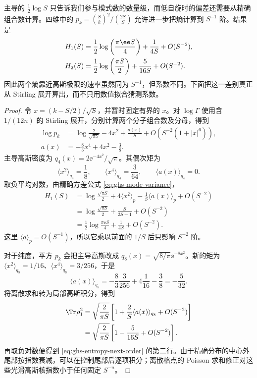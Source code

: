 \begin{proposition}[四维单体熵的有限自旋修正]
主导的 $\tfrac12\log S$ 只告诉我们参与模式数的数量级，而低自旋时的偏差还需要从精确组合数计算。四维中的 $p_k=\binom Sk^2/\binom{2S}{S}$ 允许进一步把熵计算到 $S^{-1}$ 阶。结果是
\begin{align}\label{eq:ghs-entropy-next-order}
 H_1(S)&=\frac12\log\left(\frac{\pi\ee S}{4}\right)
 +\frac1{4S}+O(S^{-2}),\\
 H_2(S)&=\frac12\log\left(\frac{\pi S}{2}\right)
 +\frac5{16S}+O(S^{-2}).\notag
\end{align}
因此两个熵靠近高斯极限的速率虽然同为 $S^{-1}$，但系数不同。下面把这一差别真正从 Stirling 展开算出，而不只用数值拟合猜测系数。
\end{proposition}

\begin{proof}
令 $x=(k-S/2)/\sqrt S$，并暂时固定有界的 $x$。对 $\log\Gamma$ 使用含 $1/(12n)$ 的 Stirling 展开，分别计算两个分子组合数及分母，得到
\begin{align*}
\log p_k
&=\log\frac2{\sqrt{\pi S}}-4x^2+\frac{a(x)}S
+O\left(S^{-2}(1+|x|^6)\right),\\
a(x)&=-\frac83x^4+4x^2-\frac38.
\end{align*}
主导高斯密度为 $q_4(x)=2\ee^{-4x^2}/\sqrt\pi$。其偶次矩为
\begin{equation*}
\langle x^2\rangle_{q_4}=\frac18,\qquad
\langle x^4\rangle_{q_4}=\frac3{64},\qquad
\langle a(x)\rangle_{q_4}=0.
\end{equation*}
取负平均对数，由精确方差公式 \cref{eq:ghs-mode-variance}，
\begin{align*}
H_1(S)
&=\log\frac{\sqrt{\pi S}}2+4\langle x^2\rangle_{p}
-\frac1S\langle a(x)\rangle_{p}+O(S^{-2})\\
&=\log\frac{\sqrt{\pi S}}2
+\frac{S}{2S-1}+O(S^{-2})\\
&=\frac12\log\frac{\pi\ee S}{4}
+\frac1{4S}+O(S^{-2}).
\end{align*}
这里 $\langle a\rangle_p=O(S^{-1})$，所以它乘以前面的 $1/S$ 后只影响 $S^{-2}$ 阶。

对于纯度，平方 $p_k$ 会把主导高斯改成 $q_8(x)=\sqrt{8/\pi}\ee^{-8x^2}$。新的矩为 $\langle x^2\rangle_{q_8}=1/16$、$\langle x^4\rangle_{q_8}=3/256$，于是
\begin{equation*}
\langle a(x)\rangle_{q_8}
=-\frac83\frac3{256}+4\frac1{16}-\frac38
=-\frac5{32}.
\end{equation*}
将离散求和转为局部高斯积分，得到
\begin{align*}
\Tr\rho_1^2
&=\sqrt{\frac2{\pi S}}
\left[1+\frac2S\langle a(x)\rangle_{q_8}
+O(S^{-2})\right]\\
&=\sqrt{\frac2{\pi S}}
\left[1-\frac5{16S}+O(S^{-2})\right].
\end{align*}
再取负对数便得到 \cref{eq:ghs-entropy-next-order} 的第二行。由于精确分布的中心外尾部按指数衰减，可以在控制尾部后逐项积分；离散格点的 Poisson 求和修正对这些光滑高斯核指数小于任何固定 $S^{-n}$。
\end{proof}

